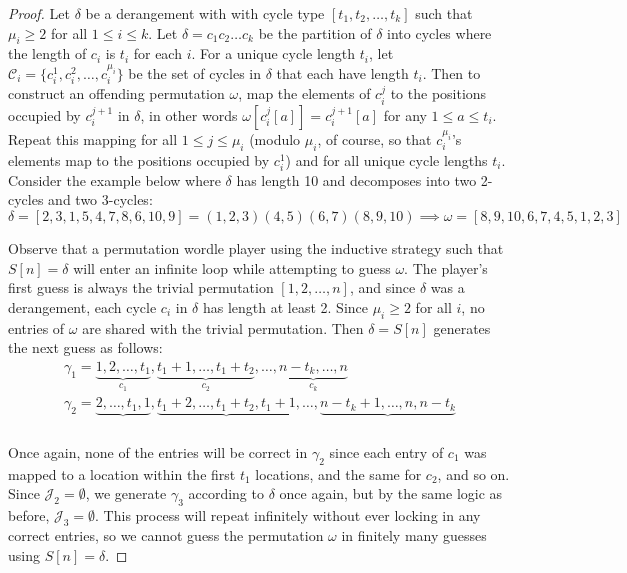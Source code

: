 \documentclass[10pt,a4paper]{amsart}
\begin{document}
\begin{proof}
Let $\delta$ be a derangement with with cycle type $[t_1, t_2, \dots, t_k]$ such that $\mu_i \geq 2$ for all $1 \leq i \leq k$. Let $\delta = c_1 c_2 \dots c_k$ be the partition of $\delta$ into cycles where the length of $c_i$ is $t_i$ for each $i$. 
For a unique cycle length $t_i$, let $\mathcal{C}_i = \{c_i^1, c_i^2, \dots, c_i^{\mu_i} \}$ be the set of cycles in $\delta$ that each have length $t_i$. Then to construct an offending permutation $\omega$, map the elements of $c_i^j$ to the positions occupied by $c_i^{j+1}$ in $\delta$, in other words $\omega[c_i^j[a]] = c_i^{j+1}[a]$ for any $1 \leq a \leq t_i$. Repeat this mapping for all $1 \leq j \leq \mu_i$ (modulo $\mu_i$, of course, so that $c_i^{\mu_i}$'s elements map to the positions occupied by $c_i^1$) and for all unique cycle lengths $t_i$. Consider the example below where $\delta$ has length 10 and decomposes into two 2-cycles and two 3-cycles:
\[ 
\delta = [2,3,1,5,4,7,8,6,10,9] 
= (1,2,3)(4,5)(6,7)(8,9,10) 
\implies \omega = [8,9,10,6,7,4,5,1,2,3]
\]

Observe that a permutation wordle player using the inductive strategy such that $S[n] = \delta$ will enter an infinite loop while attempting to guess $\omega$. The player's first guess is always the trivial permutation $[1,2,\dots, n]$, and since $\delta$ was a derangement, each cycle $c_i$ in $\delta$ has length at least 2. Since $\mu_i \geq 2$ for all $i$, no entries of $\omega$ are shared with the trivial permutation. Then $\delta = S[n]$ generates the next guess as follows:
\[
\begin{array}{cc}   
\gamma_1 = \underbrace{1,2,\dots,t_1}_{c_1},\underbrace{t_1 + 1, \dots, t_1 + t_2}_{c_2}, \dots, \underbrace{n - t_k, \dots, n}_{c_k}  \\  
\gamma_2 = \underbrace{2,\dots,t_1,1}_{},\underbrace{t_1 + 2, \dots, t_1 + t_2, t_1+1}_{}, \dots, \underbrace{n - t_k + 1, \dots, n, n-t_k}_{}  \\
\end{array}
\]

Once again, none of the entries will be correct in $\gamma_2$ since each entry of $c_1$ was mapped to a location within the first $t_1$ locations, and the same for $c_2$, and so on. Since $\mathcal{J}_2 = \emptyset$, we generate $\gamma_3$ according to $\delta$ once again, but by the same logic as before, $\mathcal{J}_3 = \emptyset$. This process will repeat infinitely without ever locking in any correct entries, so we cannot guess the permutation $\omega$ in finitely many guesses using $S[n] = \delta$. 
\end{proof}
\end{document}
